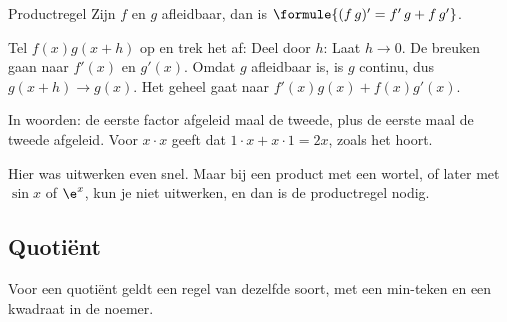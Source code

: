 \begin{theorie}
\begin{stelling}{Productregel}
Zijn $f$ en $g$ afleidbaar, dan is \quad $\formule{(f\,g)' = f'\,g + f\,g'}$.
\end{stelling}
\begin{bewijs}
Tel $f(x)g(x + h)$ op en trek het af:
Deel door $h$:
Laat $h \to 0$. De breuken gaan naar $f'(x)$ en $g'(x)$. Omdat $g$ afleidbaar is, is $g$ continu, dus $g(x + h) \to g(x)$. Het geheel gaat naar $f'(x)g(x) + f(x)g'(x)$.
\end{bewijs}
\end{theorie}

In woorden: de eerste factor afgeleid maal de tweede, plus de eerste maal de tweede afgeleid. Voor $x \cdot x$ geeft dat $1 \cdot x + x \cdot 1 = 2x$, zoals het hoort.


Hier was uitwerken even snel. Maar bij een product met een wortel, of later met $\sin x$ of $\e^x$, kun je niet uitwerken, en dan is de productregel nodig.

\begin{oefeningen}
\end{oefeningen}

\subsection{Quotiënt}

Voor een quotiënt geldt een regel van dezelfde soort, met een min-teken en een kwadraat in de noemer.

